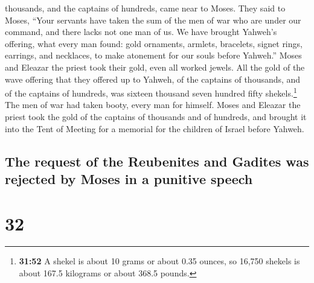 thousands, and the captains of hundreds, came near to Moses.
 They said to Moses, ``Your servants have taken the sum
of the men of war who are under our command, and there lacks not one man
of us.  We have brought Yahweh's offering, what every man
found: gold ornaments, armlets, bracelets, signet rings, earrings, and
necklaces, to make atonement for our souls before Yahweh.''
 Moses and Eleazar the priest took their gold, even all
worked jewels.  All the gold of the wave offering that
they offered up to Yahweh, of the captains of thousands, and of the
captains of hundreds, was sixteen thousand seven hundred fifty
shekels.\footnote{\textbf{31:52} A shekel is about 10 grams or about
  0.35 ounces, so 16,750 shekels is about 167.5 kilograms or about 368.5
  pounds.}  The men of war had taken booty, every man for
himself.  Moses and Eleazar the priest took the gold of
the captains of thousands and of hundreds, and brought it into the Tent
of Meeting for a memorial for the children of Israel before Yahweh.

\hypertarget{the-request-of-the-reubenites-and-gadites-was-rejected-by-moses-in-a-punitive-speech}{%
\subsection{The request of the Reubenites and Gadites was rejected by
Moses in a punitive
speech}\label{the-request-of-the-reubenites-and-gadites-was-rejected-by-moses-in-a-punitive-speech}}

\hypertarget{section-31}{%
\section{32}\label{section-31}}

